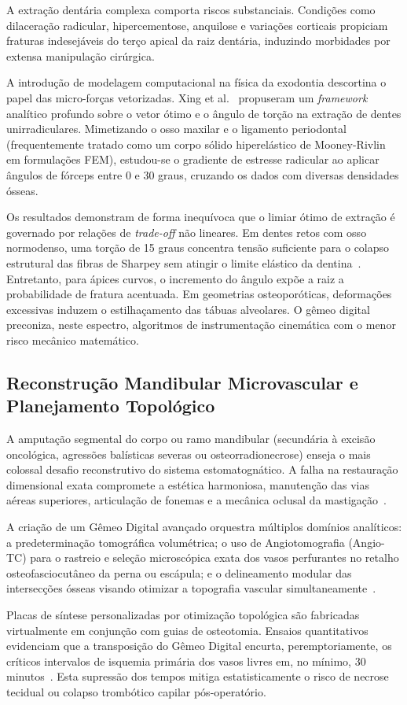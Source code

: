 A extração dentária complexa comporta riscos substanciais. Condições como dilaceração radicular, hipercementose, anquilose e variações corticais propiciam fraturas indesejáveis do terço apical da raiz dentária, induzindo morbidades por extensa manipulação cirúrgica.

A introdução de modelagem computacional na física da exodontia descortina o papel das micro-forças vetorizadas. Xing et al.~\cite{xing2024clinical} propuseram um \textit{framework} analítico profundo sobre o vetor ótimo e o ângulo de torção na extração de dentes unirradiculares. Mimetizando o osso maxilar e o ligamento periodontal (frequentemente tratado como um corpo sólido hiperelástico de Mooney-Rivlin em formulações FEM), estudou-se o gradiente de estresse radicular ao aplicar ângulos de fórceps entre 0 e 30 graus, cruzando os dados com diversas densidades ósseas.

Os resultados demonstram de forma inequívoca que o limiar ótimo de extração é governado por relações de \textit{trade-off} não lineares. Em dentes retos com osso normodenso, uma torção de 15 graus concentra tensão suficiente para o colapso estrutural das fibras de Sharpey sem atingir o limite elástico da dentina~\cite{xing2024clinical}. Entretanto, para ápices curvos, o incremento do ângulo expõe a raiz a probabilidade de fratura acentuada. Em geometrias osteoporóticas, deformações excessivas induzem o estilhaçamento das tábuas alveolares. O gêmeo digital preconiza, neste espectro, algoritmos de instrumentação cinemática com o menor risco mecânico matemático.

\subsection{Reconstrução Mandibular Microvascular e Planejamento Topológico}

A amputação segmental do corpo ou ramo mandibular (secundária à excisão oncológica, agressões balísticas severas ou osteorradionecrose) enseja o mais colossal desafio reconstrutivo do sistema estomatognático. A falha na restauração dimensional exata compromete a estética harmoniosa, manutenção das vias aéreas superiores, articulação de fonemas e a mecânica oclusal da mastigação~\cite{mdpi2025convergence}.

A criação de um Gêmeo Digital avançado orquestra múltiplos domínios analíticos: a predeterminação tomográfica volumétrica; o uso de Angiotomografia (Angio-TC) para o rastreio e seleção microscópica exata dos vasos perfurantes no retalho osteofasciocutâneo da perna ou escápula; e o delineamento modular das intersecções ósseas visando otimizar a topografia vascular simultaneamente~\cite{katsoulakis2024digital}.

Placas de síntese personalizadas por otimização topológica são fabricadas virtualmente em conjunção com guias de osteotomia. Ensaios quantitativos evidenciam que a transposição do Gêmeo Digital encurta, peremptoriamente, os críticos intervalos de isquemia primária dos vasos livres em, no mínimo, 30 minutos~\cite{khoshfekr2025digital}. Esta supressão dos tempos mitiga estatisticamente o risco de necrose tecidual ou colapso trombótico capilar pós-operatório.
